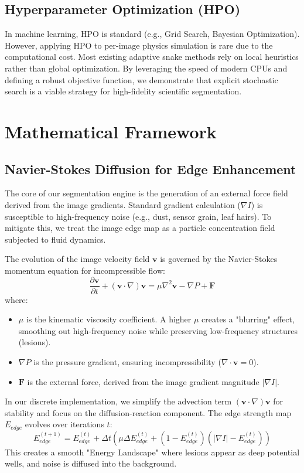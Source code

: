 \documentclass[journal]{IEEEtran}
\begin{document}
\subsection{Hyperparameter Optimization (HPO)}
In machine learning, HPO is standard (e.g., Grid Search, Bayesian Optimization). However, applying HPO to per-image physics simulation is rare due to the computational cost. Most existing adaptive snake methods rely on local heuristics rather than global optimization. By leveraging the speed of modern CPUs and defining a robust objective function, we demonstrate that explicit stochastic search is a viable strategy for high-fidelity scientific segmentation.

\section{Mathematical Framework}

\subsection{Navier-Stokes Diffusion for Edge Enhancement}
The core of our segmentation engine is the generation of an external force field derived from the image gradients. Standard gradient calculation ($\nabla I$) is susceptible to high-frequency noise (e.g., dust, sensor grain, leaf hairs). To mitigate this, we treat the image edge map as a particle concentration field subjected to fluid dynamics.

The evolution of the image velocity field $\mathbf{v}$ is governed by the Navier-Stokes momentum equation for incompressible flow:
\begin{equation}
\frac{\partial \mathbf{v}}{\partial t} + (\mathbf{v} \cdot \nabla)\mathbf{v} = \mu \nabla^2 \mathbf{v} - \nabla P + \mathbf{F}
\end{equation}
where:
\begin{itemize}
    \item $\mu$ is the kinematic viscosity coefficient. A higher $\mu$ creates a "blurring" effect, smoothing out high-frequency noise while preserving low-frequency structures (lesions).
    \item $\nabla P$ is the pressure gradient, ensuring incompressibility ($\nabla \cdot \mathbf{v} = 0$).
    \item $\mathbf{F}$ is the external force, derived from the image gradient magnitude $|\nabla I|$.
\end{itemize}

In our discrete implementation, we simplify the advection term $(\mathbf{v} \cdot \nabla)\mathbf{v}$ for stability and focus on the diffusion-reaction component. The edge strength map $E_{edge}$ evolves over iterations $t$:
\begin{equation}
E_{edge}^{(t+1)} = E_{edge}^{(t)} + \Delta t \left( \mu \Delta E_{edge}^{(t)} + (1 - E_{edge}^{(t)})(|\nabla I| - E_{edge}^{(t)}) \right)
\end{equation}
This creates a smooth "Energy Landscape" where lesions appear as deep potential wells, and noise is diffused into the background.
\end{document}
